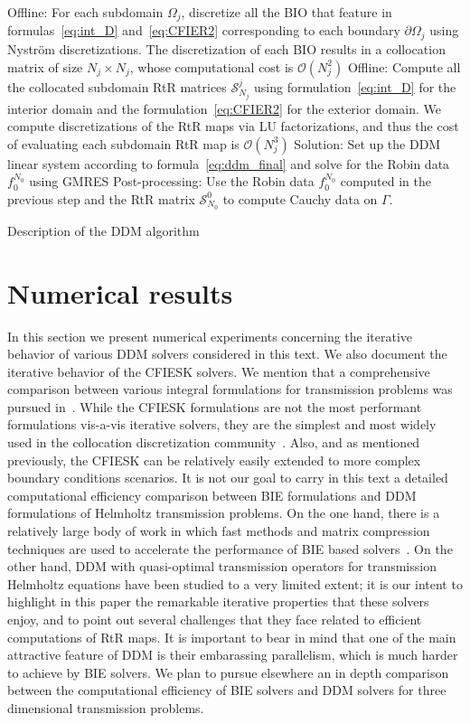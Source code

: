 \documentclass[11pt]{article}
\numberwithin{equation}{section}
\begin{document}
\begin{algorithm}
  \SetAlgoLined
  Offline: For each subdomain $\Omega_j$, discretize all the BIO that feature in formulas~\eqref{eq:int_D} and~\eqref{eq:CFIER2} corresponding to each boundary $\partial\Omega_j$ using Nystr\"om discretizations. The discretization of each BIO results in a collocation matrix of size $N_j\times N_j$, whose computational cost is $\mathcal{O}(N_j^2)$\;
  Offline: Compute all the collocated subdomain RtR matrices $\mathcal{S}^j_{N_j}$ using formulation~\eqref{eq:int_D} for the interior domain and the formulation~\eqref{eq:CFIER2} for the exterior domain. We compute discretizations of the RtR maps via LU factorizations, and thus the cost of evaluating each subdomain RtR map is $\mathcal{O}(N_j^3)$\;
  Solution: Set up the DDM linear system according to formula~\eqref{eq:ddm_final} and solve for the Robin data $f_0^{N_0}$ using GMRES\;
  Post-processing: Use the Robin data $f_0^{N_0}$ computed in the previous step and the RtR matrix $\mathcal{S}^0_{N_0}$ to compute Cauchy data on $\Gamma$.
 \caption{Description of the DDM algorithm}{\label{DDM1}}
\end{algorithm}
 

 \section{Numerical results\label{num}}

 In this section we present numerical experiments concerning the iterative behavior of various DDM solvers considered in this text. We also document the iterative behavior of the CFIESK solvers. We mention that a comprehensive comparison between various integral formulations for transmission problems was pursued in~\cite{turc2,dominguez2016well,jerez2017multitrace}. While the CFIESK formulations are not the most performant formulations vis-a-vis iterative solvers, they are the simplest and most widely used in the collocation discretization community~\cite{rokhlin-dielectric,greengard1}. Also, and as mentioned previously, the CFIESK can be relatively easily extended to more complex boundary conditions scenarios. It is not our goal to carry in this text a detailed computational efficiency comparison between BIE formulations and DDM formulations of Helmholtz transmission problems. On the one hand, there is a relatively large body of work in which fast methods and matrix compression techniques are used to accelerate the performance of BIE based solvers~\cite{greengard1,br-turc}. On the other hand, DDM with quasi-optimal transmission operators for transmission Helmholtz equations have been studied to a very limited extent; it is our intent to highlight in this paper the remarkable iterative properties that these solvers enjoy, and to point out several challenges that they face related to efficient computations of RtR maps. It is important to bear in mind that one of the main attractive feature of DDM is their embarassing parallelism, which is much harder to achieve by BIE solvers. We plan to pursue elsewhere an in depth comparison between the computational efficiency of BIE solvers and DDM solvers for three dimensional transmission problems.   
\end{document}
